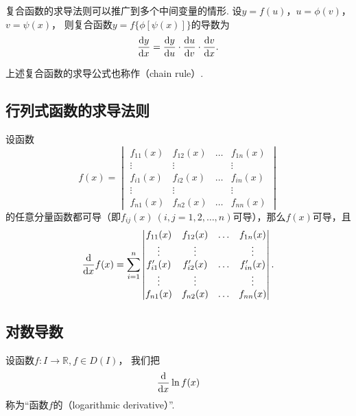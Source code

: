 复合函数的求导法则可以推广到多个中间变量的情形.
设\(y=f(u)\)，\(u=\phi(v)\)，\(v=\psi(x)\)，
则复合函数\(y=f\{\phi[\psi(x)]\}\)的导数为\[
	\dv{y}{x} = \dv{y}{u} \cdot \dv{u}{v} \cdot \dv{v}{x}.
\]

上述复合函数的求导公式也称作（chain rule）.

\subsection{行列式函数的求导法则}
\begin{theorem}
\def\f#1{f_{#1}(x)}%
\def\g#1{f_{#1}'(x)}%
设函数\[
f(x) = \begin{vmatrix}
\f{11} & \f{12} & \dots & \f{1n} \\
\vdots & \vdots & & \vdots \\
\f{i1} & \f{i2} & \dots & \f{in} \\
\vdots & \vdots & & \vdots \\
\f{n1} & \f{n2} & \dots & \f{nn}
\end{vmatrix}
\]的任意分量函数都可导（即\(\f{ij}\ (i,j=1,2,\dotsc,n)\)可导），那么\(f(x)\)可导，且\[
\dv{x} f(x) = \sum_{i=1}^n \begin{vmatrix}
\f{11} & \f{12} & \dots & \f{1n} \\
\vdots & \vdots & & \vdots \\
\g{i1} & \g{i2} & \dots & \g{in} \\
\vdots & \vdots & & \vdots \\
\f{n1} & \f{n2} & \dots & \f{nn}
\end{vmatrix}.
\]
\end{theorem}

\subsection{对数导数}
\begin{definition}
设函数\(f\colon I \to \mathbb{R}, f \in D(I)\)，
我们把\[
	\dv{x} \ln f(x)
\]称为“函数\(f\)的（logarithmic derivative）”.
\end{definition}
